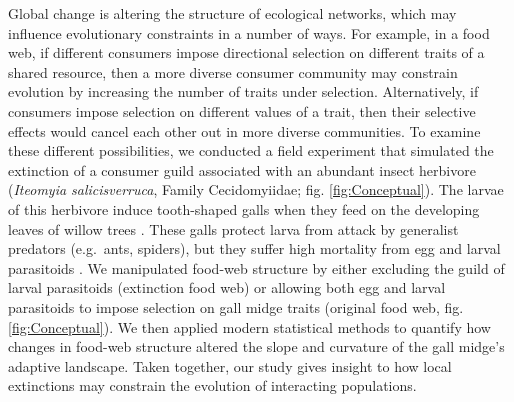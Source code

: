 \documentclass[11pt,]{article}
\begin{document}
Global change is altering the structure of ecological networks, which
may influence evolutionary constraints in a number of ways. For example,
in a food web, if different consumers impose directional selection on
different traits of a shared resource, then a more diverse consumer
community may constrain evolution by increasing the number of traits
under selection. Alternatively, if consumers impose selection on
different values of a trait, then their selective effects would cancel
each other out in more diverse communities. To examine these different
possibilities, we conducted a field experiment that simulated the
extinction of a consumer guild associated with an abundant insect
herbivore (\emph{Iteomyia salicisverruca}, Family Cecidomyiidae; fig.
\ref{fig:Conceptual}). The larvae of this herbivore induce tooth-shaped
galls when they feed on the developing leaves of willow trees
\citep[\emph{Salix} sp.,][]{Russo2006}. These galls protect larva from
attack by generalist predators (e.g.~ants, spiders), but they suffer
high mortality from egg and larval parasitoids \citep{Barbour2016}. We
manipulated food-web structure by either excluding the guild of larval
parasitoids (extinction food web) or allowing both egg and larval
parasitoids to impose selection on gall midge traits (original food web,
fig. \ref{fig:Conceptual}). We then applied modern statistical methods
to quantify how changes in food-web structure altered the slope and
curvature of the gall midge's adaptive landscape. Taken together, our
study gives insight to how local extinctions may constrain the evolution
of interacting populations.
\end{document}

